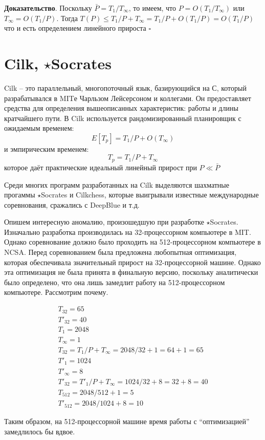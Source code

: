 \documentclass[a4paper,11pt]{article}
\begin{document}
\textbf{Доказательство}. Поскольку $\bar{P} = T_1/T_{\infty}$, то имеем, что $P
= O(T_1/T_{\infty})$ или $T_{\infty} = O(T_1/P)$. Тогда $T(P) \leqslant T_1/P +
T_{\infty} = T_1/P + O(T_1/P) = O(T_1/P)$ что и есть определением линейного
прироста $\square$

\section{Cilk, $\star$Socrates}

Cilk -- это параллельный, многопоточный язык, базирующийся на С, который
разрабатывался в MITе Чарльзом Лейсерсоном и коллегами. Он предоставляет
средства для определения вышеописанных характеристик: работы и длины кратчайшего
пути. В Cilk используется рандомизированный планировщик с ожидаемым временем:
$$
E[T_p] = T_1/P + O(T_{\infty})
$$
и эмпирическим временем:
$$
T_p = T_1/P + T_{\infty}
$$
которое даёт практические идеальный линейный прирост при $P \ll \bar{P}$

Среди многих программ разработанных на Cilk выделяются шахматные прогаммы
$\star$Socrates и Cilkchess, которые выигрывали известные международные
соревнования, сражались с DeepBlue и т.д.

Опишем интересную аномалию, произошедшую при разработке $\star$Socrates.
Изначально разработка производилась на 32-процессорном компьютере в MIT. Однако
соревнование должно было проходить на 512-процессорном компьютере в NCSA. Перед
соревнованием была предложена любопытная оптимизация, которая обеспечивала
значительный прирост на 32-процессорной машине. Однако эта оптимизация не была
принята в финальную версию, поскольку аналитически было определено, что она лишь
замедлит работу на 512-процессорном компьютере. Рассмотрим почему.

\begin{gather*}
  T_{32} = 65 \\
  T'_{32} = 40 \\
  T_1 = 2048 \\
  T_{\infty} = 1 \\
  T_{32} = T_1/P + T_{\infty} = 2048/32 + 1 = 64 + 1 = 65 \\
  T'_1 = 1024 \\
  T'_{\infty} = 8 \\
  T'_{32} = T'_1/P + T_{\infty} = 1024/32 + 8 = 32 + 8 = 40 \\
  T_{512} = 2048/512 + 1 = 5 \\
  T'_{512} = 2048/1024 + 8 = 10
\end{gather*}

Таким образом, на 512-процессорной машине время работы с ``оптимизацией''
замедлилось бы вдвое.
\end{document}
